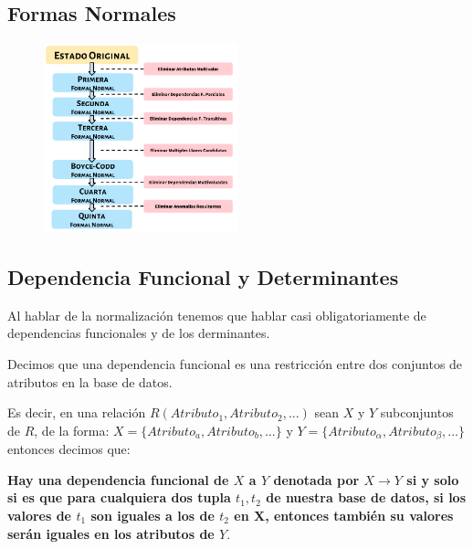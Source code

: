 \documentclass[12pt, fleqn]{report}                             %
\newcommand \longto {\longrightarrow}                           %
\begin{document}
            \subsection{Formas Normales}

                \begin{figure}[h]
                    \centering
                    \includegraphics[width=0.50\textwidth]{Normalizacion}
                \end{figure}



            \clearpage
            \subsection{Dependencia Funcional y Determinantes}

                Al hablar de la normalización tenemos que hablar casi obligatoriamente
                de dependencias funcionales y de los derminantes.

                Decimos que una dependencia funcional es una restricción entre dos conjuntos
                de atributos en la base de datos.

                Es decir, en una relación $R(Atributo_1, Atributo_2, \dots)$ sean $X$ y $Y$ subconjuntos de $R$, de la forma: $X = \{Atributo_a, Atributo_b, \dots\}$ y 
                $Y = \{Atributo_\alpha, Atributo_\beta, \dots\}$ entonces decimos que:

                \textbf{Hay una dependencia funcional de $X$ a $Y$ denotada por $X \longto Y$
                si y solo si es que para cualquiera dos tupla $t_1, t_2$ de nuestra base de
                datos, si los valores de $t_1$ son iguales a los de $t_2$ en X, entonces
                también su valores serán iguales en los atributos de $Y$}.
\end{document}
